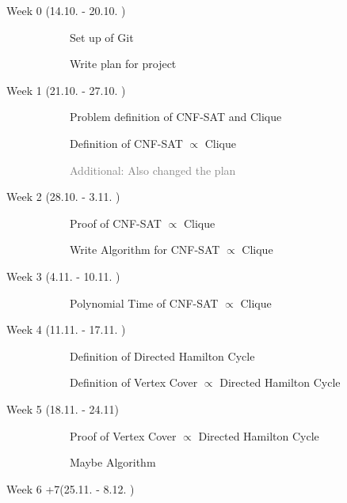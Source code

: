 \documentclass[11pt,a4paper]{scrartcl}
\begin{document}
	\begin{description}
		\item[Week 0 (14.10. - 20.10. )] \hfill
		\begin{description}
			\item[\textcolor{Green}{\CheckedBox}] Set up of Git
			\item[\textcolor{Green}{\CheckedBox}] Write plan for project 
		\end{description}
		\item[ Week 1 (21.10. - 27.10. )] \hfill 
		\begin{description}
			\item[\textcolor{Green}{\CheckedBox}] Problem definition of CNF-SAT and Clique
			\item[\textcolor{Green}{\CheckedBox}] Definition of CNF-SAT $\varpropto$ Clique
			\item[] \textcolor{gray}{Additional: Also changed the plan}
		\end{description}
		\item[Week 2 (28.10. - 3.11. )] \hfill
		\begin{description}
			\item[\textcolor{Green}{\CheckedBox}]Proof of CNF-SAT $\varpropto$ Clique
			\item[\Square] Write Algorithm for CNF-SAT $\varpropto$ Clique
			\end{description}
		\item[Week 3 (4.11. - 10.11. )]\hfill \begin{description}
			\item[\Square] Polynomial Time of CNF-SAT $\varpropto$ Clique
		\end{description} 
		\item[Week 4 (11.11. - 17.11. )] \hfill
		\begin{description}
			\item[\Square] Definition of  Directed Hamilton Cycle
			\item[\Square] Definition of Vertex Cover $\varpropto$ Directed Hamilton Cycle
		\end{description} 
		\item[Week 5 (18.11. - 24.11)] \hfill
		\begin{description}
			\item[\Square] Proof of Vertex Cover $\varpropto$ Directed Hamilton Cycle
			\item[\Square] Maybe Algorithm
		\end{description}
		\item[Week 6 +7(25.11. - 8.12. )] \hfill

\end{description}
\end{document}
